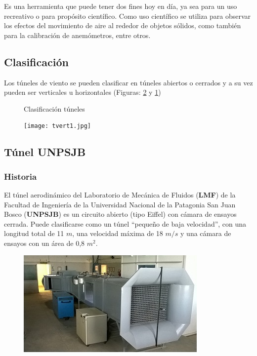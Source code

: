 


\begin{tcolorbox}[colback=blue!5!white,colframe=blue!75!black,title=Túnel de viento]
Es una herramienta que puede tener dos fines hoy en día, ya sea para un uso recreativo o para propósito científico.
Como uso científico se utiliza para observar los efectos del movimiento de aire al rededor de objetos sólidos, como también para la calibración de anemómetros, entre otros.
\end{tcolorbox}


\subsection{Clasificación}
Los túneles de viento se pueden clasificar en túneles abiertos o cerrados y a su vez pueden ser verticales u horizontales (Figuras: \ref{fig:tunelRec} y \ref{fig:abierto})


\begin{figure}[htbp]
    \centering
    \caption{Clasificación túneles} \label{fig:abierto}
    \end{figure}

\begin{figure}[htb]
	\centering
	\texttt{[image: tvert1.jpg]}
	\label{fig:tunelRec}
\end{figure}

\subsection{Túnel UNPSJB}

\subsubsection{Historia}
\cite{tunelweb}	El túnel aerodinámico del Laboratorio de Mecánica de Fluidos (\textbf{LMF}) de la Facultad de Ingeniería de la Universidad Nacional de la Patagonia San Juan Bosco (\textbf{UNPSJB}) es un circuito abierto (tipo Eiffel) con cámara de ensayos cerrada. Puede clasificarse como un túnel “pequeño de baja velocidad”, con una longitud total de 11 $m$, una velocidad máxima de 18 $m/s$ y una cámara de ensayos con un área de 0,8 $m^2$.
	
	\begin{figure}[htb]
		\centering
		\includegraphics[scale=0.9]{tunel_unpsjb.JPG}
		\label{fig:tunelUni}
	\end{figure}
	

